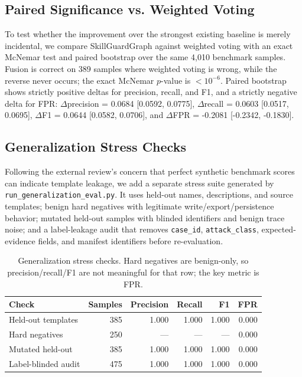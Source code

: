 \documentclass[10pt]{article}
\begin{document}
\subsection{Paired Significance vs. Weighted Voting}

To test whether the improvement over the strongest existing baseline is merely
incidental, we compare SkillGuardGraph against weighted voting with an exact
McNemar test and paired bootstrap over the same 4{,}010 benchmark samples.
Fusion is correct on 389 samples where weighted voting is wrong, while the
reverse never occurs; the exact McNemar $p$-value is $< 10^{-6}$.
Paired bootstrap shows strictly positive deltas for precision, recall, and F1,
and a strictly negative delta for FPR: $\Delta$precision = 0.0684
[0.0592, 0.0775], $\Delta$recall = 0.0603 [0.0517, 0.0695],
$\Delta$F1 = 0.0644 [0.0582, 0.0706], and
$\Delta$FPR = -0.2081 [-0.2342, -0.1830].


\subsection{Generalization Stress Checks}
\label{sec:generalization}

Following the external review's concern that perfect synthetic benchmark scores can indicate template leakage, we add a separate stress suite generated by \texttt{run\_generalization\_eval.py}. It uses held-out names, descriptions, and source templates; benign hard negatives with legitimate write/export/persistence behavior; mutated held-out samples with blinded identifiers and benign trace noise; and a label-leakage audit that removes \texttt{case\_id}, \texttt{attack\_class}, expected-evidence fields, and manifest identifiers before re-evaluation.

\begin{table}[t]
\centering
\caption{Generalization stress checks. Hard negatives are benign-only, so precision/recall/F1 are not meaningful for that row; the key metric is FPR.}
\label{tab:generalization}
\begin{tabular}{lrrrrr}
\toprule
Check & Samples & Precision & Recall & F1 & FPR \\
\midrule
Held-out templates & 385 & 1.000 & 1.000 & 1.000 & 0.000 \\
Hard negatives & 250 & --- & --- & --- & 0.000 \\
Mutated held-out & 385 & 1.000 & 1.000 & 1.000 & 0.000 \\
Label-blinded audit & 475 & 1.000 & 1.000 & 1.000 & 0.000 \\
\bottomrule
\end{tabular}
\end{table}
\end{document}
